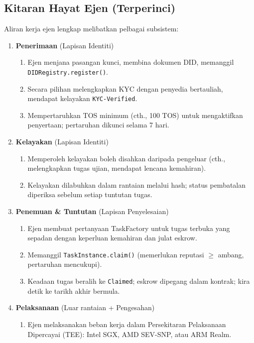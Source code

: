 \documentclass[11pt]{article}
\begin{document}
\subsection{Kitaran Hayat Ejen (Terperinci)}
Aliran kerja ejen lengkap melibatkan pelbagai subsistem:

\begin{enumerate}
  \item \textbf{Penerimaan} (Lapisan Identiti)
    \begin{enumerate}[label=\alph*.]
      \item Ejen menjana pasangan kunci, membina dokumen DID, memanggil \texttt{DIDRegistry.register()}.
      \item Secara pilihan melengkapkan KYC dengan penyedia bertauliah, mendapat kelayakan \texttt{KYC-Verified}.
      \item Mempertaruhkan TOS minimum (cth., 100 TOS) untuk mengaktifkan penyertaan; pertaruhan dikunci selama 7 hari.
    \end{enumerate}
  \item \textbf{Kelayakan} (Lapisan Identiti)
    \begin{enumerate}[label=\alph*.]
      \item Memperoleh kelayakan boleh disahkan daripada pengeluar (cth., melengkapkan tugas ujian, mendapat lencana kemahiran).
      \item Kelayakan dilabuhkan dalam rantaian melalui hash; status pembatalan diperiksa sebelum setiap tuntutan tugas.
    \end{enumerate}
  \item \textbf{Penemuan \& Tuntutan} (Lapisan Penyelesaian)
    \begin{enumerate}[label=\alph*.]
      \item Ejen membuat pertanyaan TaskFactory untuk tugas terbuka yang sepadan dengan keperluan kemahiran dan julat eskrow.
      \item Memanggil \texttt{TaskInstance.claim()} (memerlukan reputasi $\geq$ ambang, pertaruhan mencukupi).
      \item Keadaan tugas beralih ke \texttt{Claimed}; eskrow dipegang dalam kontrak; kira detik ke tarikh akhir bermula.
    \end{enumerate}
  \item \textbf{Pelaksanaan} (Luar rantaian + Pengesahan)
    \begin{enumerate}[label=\alph*.]
      \item Ejen melaksanakan beban kerja dalam Persekitaran Pelaksanaan Dipercayai (TEE): Intel SGX, AMD SEV-SNP, atau ARM Realm.

\end{enumerate}
\end{enumerate}
\end{document}
